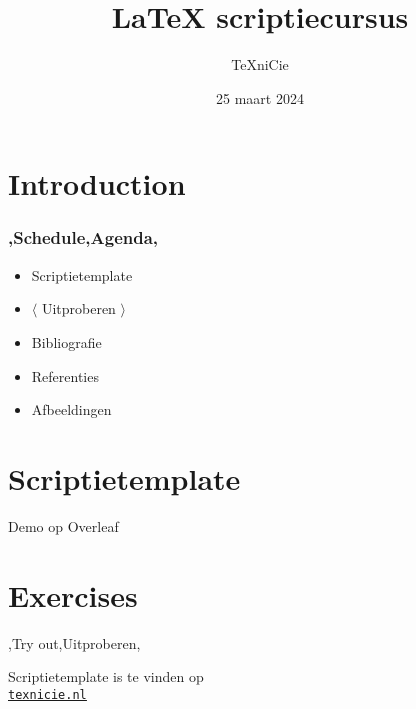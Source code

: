 \documentclass[
    dutch,
    everyoneauthor=true,
    defaultSlideCollection=vincent,
]{../../cursuspresentatie}
\title[\LaTeX{} scriptiecursus]{\LaTeX{} scriptiecursus}
\author[\TeX niCie]{\TeX niCie}%
\date{25 maart 2024}
\begin{document}
\def\placetarget{\hypertarget{introduction}{}}
\section{Introduction}



\begin{frame}
    \frametitle{\lang,Schedule,Agenda,}
    
    \begin{itemize}[label=\textbullet]
        \item Scriptietemplate
        \item $ \langle $ Uitproberen $ \rangle $
        \item Bibliografie
        \item Referenties
        \item Afbeeldingen
    \end{itemize}
\end{frame}

\section{Scriptietemplate}
\begin{frame}
    Demo op Overleaf
\end{frame}


\section{Exercises}
\def\placetarget{\hypertarget{exercises1}{}}

\begin{frame}
    \begin{center}
        {\LARGE \lang,Try out,Uitproberen,}
        \vspace{30pt}

        


        {\Large Scriptietemplate is te vinden op\\
         \href{https://texnicie.nl}{\ul{\texttt{texnicie.nl}}}}
    \end{center}
\end{frame}
\end{document}
